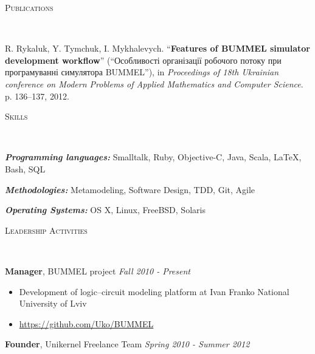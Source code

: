 \documentclass{article}
\newenvironment{changemargin}[2]{%
  \begin{list}{}{%
    \setlength{\topsep}{0pt}%
    \setlength{\leftmargin}{#1}%
    \setlength{\rightmargin}{#2}%
    \setlength{\listparindent}{\parindent}%
    \setlength{\itemindent}{\parindent}%
    \setlength{\parsep}{\parskip}%
  }%
  \item[]}{\end{list}
}
\newcommand{\lineover}{
  \begin{changemargin}{-1mm}{-1mm}
    \vspace*{-8pt}
    \hrulefill \\
    \vspace*{-2pt}
  \end{changemargin}
}
\newcommand{\header}[1]{
  \begin{changemargin}{-12mm}{-12mm}
    \scshape{#1}\\
    \lineover
  \end{changemargin}
}
\newenvironment{body}{
  \vspace*{-16pt}
  \begin{changemargin}{-6mm}{-12mm}
}{
  \end{changemargin}
}
\begin{document}
\smallskip

\header{Publications}

\begin{body}
  \vspace{14pt}
  R. Rykaluk, Y. Tymchuk, I. Mykhalevych. ``\textbf{Features of BUMMEL simulator development workflow}'' (``Особливості організації робочого потоку при програмуванні симулятора BUMMEL''), in \emph{Proceedings of 18th Ukrainian conference on Modern Problems of Applied Mathematics and Computer Science}. p. 136--137, 2012.\\

\end{body}

\smallskip

\header{Skills}

\begin{body}
  \vspace{14pt}
  \emph{\textbf{Programming languages:}}{} Smalltalk, Ruby, Objective-C, Java, Scala, \LaTeX, Bash, SQL
  \medskip
  
  \emph{\textbf{Methodologies:}}{} Metamodeling, Software Design, TDD, Git, Agile
  \medskip
  
  \emph{\textbf{Operating Systems:}}{} OS X, Linux, FreeBSD, Solaris
\end{body}

\smallskip


\header{Leadership Activities}

\begin{body}
  \vspace{14pt}
  \textbf{Manager}, BUMMEL project \hfill{} \emph{Fall 2010 - Present}\\
  \vspace*{-4pt}
  \begin{itemize} \itemsep -0pt
    \item Development of logic--circuit modeling platform at Ivan Franko National University of Lviv 
    \item \url{https://github.com/Uko/BUMMEL}
  \end{itemize}
  \smallskip
  \textbf{Founder}, Unikernel Freelance Team \hfill {} \emph{Spring 2010 - Summer 2012}\\
\end{body}
\end{document}
